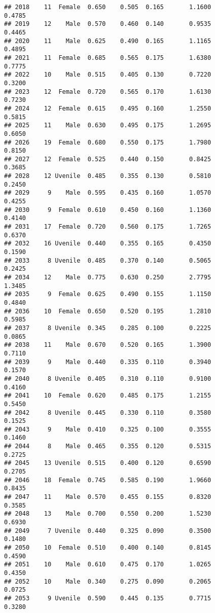 \documentclass[
]{article}
\begin{document}
\begin{verbatim}
## 2018    11  Female  0.650    0.505  0.165       1.1600         0.4785
## 2019    12    Male  0.570    0.460  0.140       0.9535         0.4465
## 2020    11    Male  0.625    0.490  0.165       1.1165         0.4895
## 2021    11  Female  0.685    0.565  0.175       1.6380         0.7775
## 2022    10    Male  0.515    0.405  0.130       0.7220         0.3200
## 2023    12  Female  0.720    0.565  0.170       1.6130         0.7230
## 2024    12  Female  0.615    0.495  0.160       1.2550         0.5815
## 2025    11    Male  0.630    0.495  0.175       1.2695         0.6050
## 2026    19  Female  0.680    0.550  0.175       1.7980         0.8150
## 2027    12  Female  0.525    0.440  0.150       0.8425         0.3685
## 2028    12 Uvenile  0.485    0.355  0.130       0.5810         0.2450
## 2029     9    Male  0.595    0.435  0.160       1.0570         0.4255
## 2030     9  Female  0.610    0.450  0.160       1.1360         0.4140
## 2031    17  Female  0.720    0.560  0.175       1.7265         0.6370
## 2032    16 Uvenile  0.440    0.355  0.165       0.4350         0.1590
## 2033     8 Uvenile  0.485    0.370  0.140       0.5065         0.2425
## 2034    12    Male  0.775    0.630  0.250       2.7795         1.3485
## 2035     9  Female  0.625    0.490  0.155       1.1150         0.4840
## 2036    10  Female  0.650    0.520  0.195       1.2810         0.5985
## 2037     8 Uvenile  0.345    0.285  0.100       0.2225         0.0865
## 2038    11    Male  0.670    0.520  0.165       1.3900         0.7110
## 2039     9    Male  0.440    0.335  0.110       0.3940         0.1570
## 2040     8 Uvenile  0.405    0.310  0.110       0.9100         0.4160
## 2041    10  Female  0.620    0.485  0.175       1.2155         0.5450
## 2042     8 Uvenile  0.445    0.330  0.110       0.3580         0.1525
## 2043     9    Male  0.410    0.325  0.100       0.3555         0.1460
## 2044     8    Male  0.465    0.355  0.120       0.5315         0.2725
## 2045    13 Uvenile  0.515    0.400  0.120       0.6590         0.2705
## 2046    18  Female  0.745    0.585  0.190       1.9660         0.8435
## 2047    11    Male  0.570    0.455  0.155       0.8320         0.3585
## 2048    13    Male  0.700    0.550  0.200       1.5230         0.6930
## 2049     7 Uvenile  0.440    0.325  0.090       0.3500         0.1480
## 2050    10  Female  0.510    0.400  0.140       0.8145         0.4590
## 2051    10    Male  0.610    0.475  0.170       1.0265         0.4350
## 2052    10    Male  0.340    0.275  0.090       0.2065         0.0725
## 2053     9 Uvenile  0.590    0.445  0.135       0.7715         0.3280

\end{verbatim}
\end{document}

